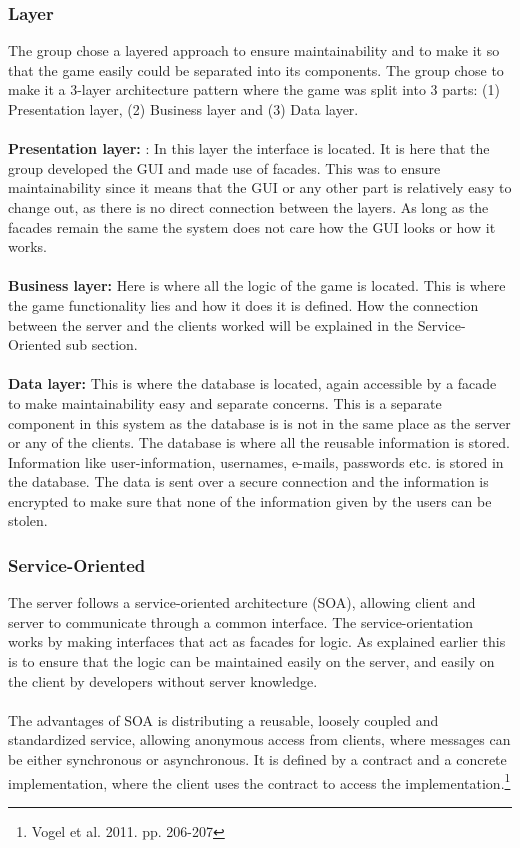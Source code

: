 \subsubsection{Layer}
The group chose a layered approach to ensure maintainability and to make it
so that the game easily could be separated into its components. The group
chose to make it a 3-layer architecture pattern where the game was split
into 3 parts: (1) Presentation layer, (2) Business layer and (3) Data layer.
\\
\\
\textbf{Presentation layer:} : In this layer the interface is located.
It is here that the group developed the GUI and made use of facades.
This was to ensure maintainability since it means that the GUI or any
other part is relatively easy to change out, as there is no direct
connection between the layers. As long as the facades remain the same
the system does not care how the GUI looks or how it works.
\\
\\
\textbf{Business layer:} Here is where all the logic of the game is
located. This is where the game functionality lies and how it does it
is defined. How the connection between the server and the clients worked
 will be explained in the Service-Oriented sub section.
\\
\\
\textbf{Data layer:} This is where the database is located, again
accessible by a facade to make maintainability easy and separate concerns.
 This is a separate component in this system as the database is is not in
 the same place as the server or any of the clients. The database is where
  all the reusable information is stored. Information like user-information,
  usernames, e-mails, passwords etc. is stored in the database. The data is
   sent over a secure connection and the information is encrypted to make sure
    that none of the information given by the users can be stolen.
\\
\subsubsection{Service-Oriented}
The server follows a service-oriented architecture (SOA), allowing client
 and server to communicate through a common interface.
 The service-orientation works by making interfaces that act as facades
  for logic. As explained earlier this is to ensure that the logic can
   be maintained easily on the server, and easily on the client by developers
    without server knowledge.
\\
\\
The advantages of SOA is distributing a reusable, loosely coupled and
 standardized service, allowing anonymous access from clients, where
  messages can be either synchronous or asynchronous. It is defined by
  a contract and a concrete implementation, where the client uses the
  contract to access the
  implementation.\footnote{Vogel et al. 2011. pp. 206-207}
\\
